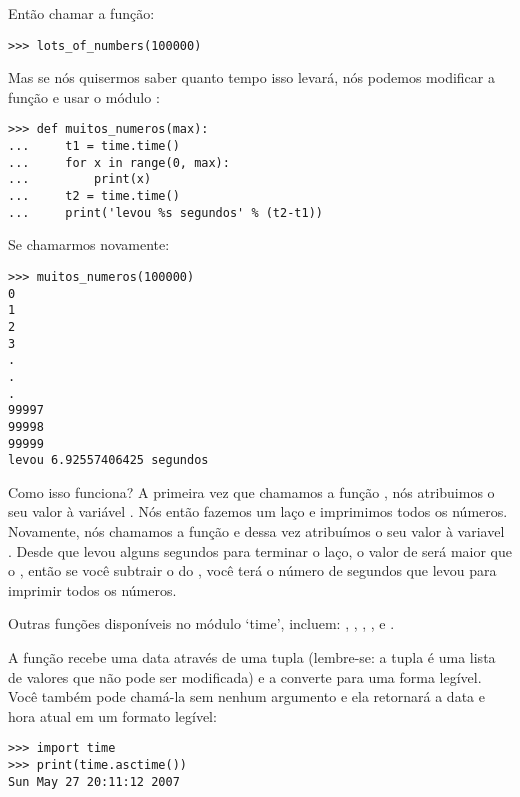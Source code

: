 \noindent
Então chamar a função:

\begin{listing}
\begin{verbatim}
>>> lots_of_numbers(100000)
\end{verbatim}
\end{listing}

\noindent
Mas se nós quisermos saber quanto tempo isso levará, nós podemos modificar a função e usar o módulo :

\begin{listing}
\begin{verbatim}
>>> def muitos_numeros(max):
...     t1 = time.time()
...     for x in range(0, max):
...         print(x)
...     t2 = time.time()
...     print('levou %s segundos' % (t2-t1))
\end{verbatim}
\end{listing}

\noindent
Se chamarmos novamente:

\begin{listingignore}
\begin{verbatim}
>>> muitos_numeros(100000)
0
1
2
3
.
.
.
99997
99998
99999
levou 6.92557406425 segundos
\end{verbatim}
\end{listingignore}

\noindent
Como isso funciona? A primeira vez que chamamos a função , nós atribuimos o seu valor à variável . Nós então fazemos um laço e imprimimos todos os números. Novamente, nós chamamos a função  e dessa vez atribuímos o seu valor à variavel . Desde que levou alguns segundos para terminar o laço, o valor de  será maior que o , então se você subtrair o  do , você terá o número de segundos que levou para imprimir todos os números.

Outras funções disponíveis no módulo `time', incluem: , , , ,  e .

A função  recebe uma data através de uma tupla (lembre-se: a tupla é uma lista de valores que não pode ser modificada) e a converte para uma forma legível. Você também pode chamá-la sem nenhum argumento e ela retornará a data e hora atual em um formato legível:

\begin{listingignore}
\begin{verbatim}
>>> import time
>>> print(time.asctime())
Sun May 27 20:11:12 2007
\end{verbatim}
\end{listingignore}

